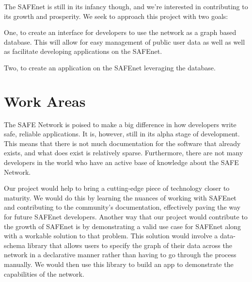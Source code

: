 \documentclass[twocolumn, 12pt]{article}
\begin{document}
The SAFEnet is still in its infancy though, and we're interested in
contributing to its growth and prosperity. We seek to approach this
project with two goals:

One, to create an interface for developers to use the network as a
graph based database. This will allow for easy management of
public user data as well as well as facilitate developing applications
on the SAFEnet.

Two, to create an application on the SAFEnet leveraging the database.

\section{Work Areas}

The SAFE Network is poised to make a big difference in how developers
write safe, reliable applications.  It is, however, still in its alpha
stage of development.  This means that there is not much documentation
for the software that already exists, and what does exist is relatively
sparse.  Furthermore, there are not many developers in the world who
have an active base of knowledge about the SAFE Network.

Our project would help to bring a cutting-edge piece of technology closer
to maturity.  We would do this by learning the nuances of working with
SAFEnet and contributing to the community's documentation, effectively
paving the way for future SAFEnet developers.  Another way that our
project would contribute to the growth of SAFEnet is by demonstrating a
valid use case for SAFEnet along with a workable solution to that problem.
This solution would involve a data-schema library that allows users to
specify the graph of their data across the network in a declarative manner
rather than having to go through the process manually.  We would then use
this library to build an app to demonstrate the capabilities of the network.
\end{document}
